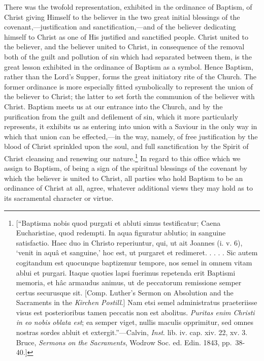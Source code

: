 \documentclass[]{book}
\begin{document}
There was the twofold representation, exhibited in the ordinance of Baptism, of Christ giving Himself to the believer in the two great initial blessings of the covenant,---justification and sanctification,---and of the believer dedicating himself to Christ as one of His justified and sanctified people. Christ united to the believer, and the believer united to Christ, in consequence of the removal both of the guilt and pollution of sin which had separated between them, is the great lesson exhibited in the ordinance of Baptism as a symbol. Hence Baptism, rather than the Lord's Supper, forms the great initiatory rite of the Church. The former ordinance is more especially fitted symbolically to represent the union of the believer to Christ; the latter to set forth the communion of the believer with Christ. Baptism meets us at our entrance into the Church, and by the purification from the guilt and defilement of sin, which it more particularly represents, it exhibits us as entering into union with a Saviour in the only way in which that union can be effected,---in the way, namely, of free justification by the blood of Christ sprinkled upon the soul, and full sanctification by the Spirit of Christ cleansing and renewing our nature.\footnote{{[}``Baptisma nobis quod purgati et abluti simus testificatur; Caena Eucharistiae, quod redempti. In aqua figuratur ablutio; in sanguine satisfactio. Haec duo in Christo reperiuntur, qui, ut ait Joannes (i. v. 6), `venit in aquâ et sanguine,' hoc est, ut purgaret et redimeret. . . . . Sic autem cogitandum est quocunque baptizemur tempore, nos semel in omnem vitam ablui et purgari. Itaque quoties lapsi fuerimus repetenda erit Baptismi memoria, et hâc armaudus animus, ut de peccatorum remissione semper certus securusque sit. {[}Comp. Luther's Sermon on Absolution and the Sacraments in the \emph{Kirchen Postill}.{]} Nam etsi semel administratus praeteriisse visus est posterioribus tamen peccatis non est abolitus. \emph{Puritas enim Christi in eo nobis oblata est}; ea semper viget, nullis maculis opprimitur, sed omnes nostras sordes abluit et extergit.''---Calvin, \emph{Inst}. lib. iv. cap. xiv. 22, xv. 3. Bruce, \emph{Sermons on the Sacraments}, Wodrow Soc. ed. Edin. 1843, pp.~38-40.{]}} In regard to this office which we assign to Baptism, of being a sign of the spiritual blessings of the covenant by which the believer is united to Christ, all parties who hold Baptism to be an ordinance of Christ at all, agree, whatever additional views they may hold as to its sacramental character or virtue.
\end{document}
